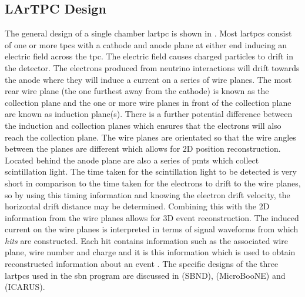 \subsection{LArTPC Design}
The general design of a single chamber \gls{lartpc} is shown in . Most \glspl{lartpc} consist of one or more \glspl{tpc} with a cathode and anode plane at either end inducing an electric field across the \gls{tpc}. The electric field causes charged particles to drift in the detector. The electrons produced from neutrino interactions will drift towards the anode where they will induce a current on a series of wire planes. The most rear wire plane (the one furthest away from the cathode) is known as the collection plane and the one or more wire planes in front of the collection plane are known as induction plane(s). There is a further potential difference between the induction and collection planes which ensures that the electrons will also reach the collection plane. The wire planes are orientated so that the wire angles between the planes are different which allows for 2D position reconstruction. Located behind the anode plane are also a series of \glspl{pmt} which collect scintillation light. The time taken for the scintillation light to be detected is very short in comparison to the time taken for the electrons to drift to the wire planes, so by using this timing information and knowing the electron drift velocity, the horizontal drift distance may be determined. Combining this with the 2D information from the wire planes allows for 3D event reconstruction. The induced current on the wire planes is interpreted in terms of signal waveforms from which \textit{hits} are constructed. Each hit contains information such as the associated wire plane, wire number and charge and it is this information which is used to obtain reconstructed information about an event \cite{Design_and_Construction_of_the_MicroBooNE_Detector}. The specific designs of the three \glspl{lartpc} used in the \gls{sbn} program are discussed in  (SBND),  (MicroBooNE) and  (ICARUS).

